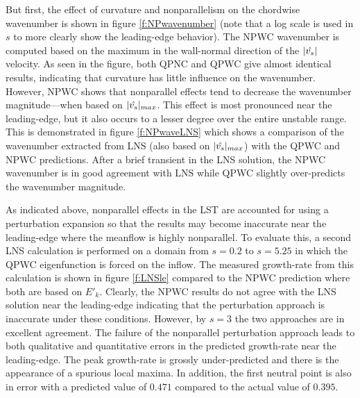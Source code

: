 But first, the effect of curvature and nonparallelism on the chordwise
wavenumber is shown in figure \ref{f:NPwavenumber} (note that a log scale is
used in $s$ to more clearly show the leading-edge behavior).  The NPWC
wavenumber is computed based on the maximum in the wall-normal direction of
the $|\hat{{v_s}}|$ velocity.  As seen in the figure, both QPNC and QPWC give
almost identical results, indicating that curvature has little influence on
the wavenumber.  However, NPWC shows that nonparallel effects tend to decrease
the wavenumber magnitude---when based on $|\hat{{v_s}}|_{max}$.  This effect is
most pronounced near the leading-edge, but it also occurs to a lesser degree
over the entire unstable range.  This is demonstrated in figure
\ref{f:NPwaveLNS} which shows a comparison of the wavenumber extracted from
LNS (also based on $|\hat{{v_s}}|_{max}$) with the QPWC and NPWC predictions.
After a brief transient in the LNS solution, the NPWC wavenumber is in good
agreement with LNS while QPWC slightly over-predicts the wavenumber magnitude.

As indicated above, nonparallel effects in the LST are accounted for using a
perturbation expansion so that the results may become inaccurate near the
leading-edge where the meanflow is highly nonparallel.  To evaluate this, a
second LNS calculation is performed on a domain from $s = 0.2$ to $s=5.25$ in
which the QPWC eigenfunction is forced on the inflow.  The measured
growth-rate from this calculation is shown in figure \ref{f:LNSle} compared to
the NPWC prediction where both are based on $E'_k$.  Clearly, the NPWC results
do not agree with the LNS solution near the leading-edge indicating that the
perturbation approach is inaccurate under these conditions.  However, by $s=3$
the two approaches are in excellent agreement.  The failure of the nonparallel
perturbation approach leads to both qualitative and quantitative errors in the
predicted growth-rate near the leading-edge.  The peak growth-rate is grossly
under-predicted and there is the appearance of a spurious local maxima.  In
addition, the first neutral point is also in error with a predicted value of
$0.471$ compared to the actual value of $0.395$.

